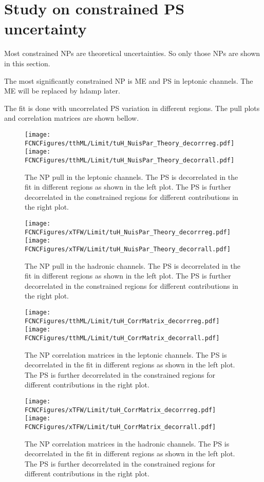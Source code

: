\section{Study on constrained PS uncertainty}
\label{sec:decor}
Most constrained NPs are theoretical uncertainties. So only those NPs are shown in this section.

The most significantly constrained NP is ME and PS in leptonic channels. The ME will be replaced by hdamp later.

The fit is done with uncorrelated PS variation in different regions. The pull plots and correlation matrices are shown bellow.

\begin{figure}[H]
\centering
\texttt{[image: \\FCNCFigures/tthML/Limit/tuH\_NuisPar\_Theory\_decorrreg.pdf]}
\texttt{[image: \\FCNCFigures/tthML/Limit/tuH\_NuisPar\_Theory\_decorrall.pdf]}
\caption{ The NP pull in the leptonic channels. The PS is decorrelated in the fit in different regions as shown in the left plot. The PS is further decorrelated in the constrained regions for different contributions in the right plot. }
\label{fig:tuH_NuisPar_decorr}
\end{figure}

\begin{figure}[H]
\centering
\texttt{[image: \\FCNCFigures/xTFW/Limit/tuH\_NuisPar\_Theory\_decorrreg.pdf]}
\texttt{[image: \\FCNCFigures/xTFW/Limit/tuH\_NuisPar\_Theory\_decorrall.pdf]}
\caption{ The NP pull in the hadronic channels. The PS is decorrelated in the fit in different regions as shown in the left plot. The PS is further decorrelated in the constrained regions for different contributions in the right plot. }
\label{fig:tuH_NuisPar_decorr}
\end{figure}


\begin{figure}[H]
\centering
\texttt{[image: \\FCNCFigures/tthML/Limit/tuH\_CorrMatrix\_decorrreg.pdf]}
\texttt{[image: \\FCNCFigures/tthML/Limit/tuH\_CorrMatrix\_decorrall.pdf]}
\caption{ The NP correlation matrices in the leptonic channels. The PS is decorrelated in the fit in different regions as shown in the left plot. The PS is further decorrelated in the constrained regions for different contributions in the right plot. }
\label{fig:tuH_CorrMatrix_decorr}
\end{figure}

\begin{figure}[H]
\centering
\texttt{[image: \\FCNCFigures/xTFW/Limit/tuH\_CorrMatrix\_decorrreg.pdf]}
\texttt{[image: \\FCNCFigures/xTFW/Limit/tuH\_CorrMatrix\_decorrall.pdf]}
\caption{ The NP correlation matrices in the hadronic channels. The PS is decorrelated in the fit in different regions as shown in the left plot. The PS is further decorrelated in the constrained regions for different contributions in the right plot. }
\label{fig:tuH_CorrMatrix_decorr}
\end{figure}